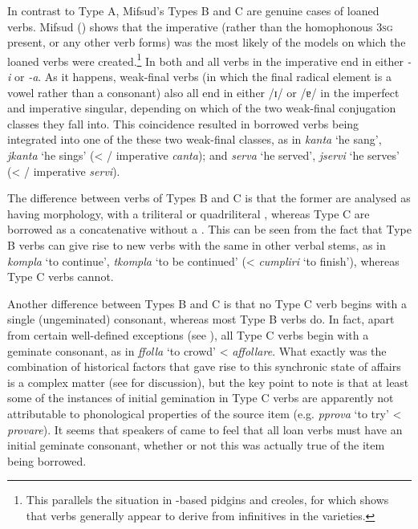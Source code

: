 \documentclass[output=paper]{langsci/langscibook}
\begin{document}
In contrast to Type A, Mifsud's Types B and C are genuine cases of loaned verbs. Mifsud (\citeyear[110--116]{mifsudloanverbs}) shows that the imperative (rather than the homophonous 3\textsc{sg} present, or any other verb forms) was the most likely  of the  models on which the  loaned verbs were created.\footnote{This parallels the situation in -based pidgins and creoles, for which \cite{Versteegh2014pidgin} shows that verbs generally appear to derive from infinitives in the  varieties.} In both  and  all verbs in the imperative end in either \textit{-i} or \textit{-a}. As it happens,  weak-final verbs (in which the final radical element is a vowel rather than a consonant) also all end in either /ɪ/ or /ɐ/ in the imperfect and imperative singular, depending on which of the two weak-final conjugation classes they fall into. This coincidence resulted in borrowed  verbs being integrated into one of the these two weak-final classes, as in \textit{kanta} `he sang', \textit{jkanta} `he sings' (< / imperative \textit{canta}); and \textit{serva} `he served', \textit{jservi} `he serves' (< / imperative \textit{servi}).

The difference between verbs of Types B and C is that the former are analysed as having  morphology, with a triliteral or quadriliteral , whereas Type C are borrowed as a concatenative  without a . This can be seen from the fact that Type B verbs can give rise to new verbs with the same  in other verbal stems, as in \textit{kompla} `to continue', \textit{tkompla} `to be continued' (<  \textit{cumpliri} `to finish'), whereas Type C verbs cannot.

Another difference between Types B and C is that no Type C verb begins with a single (ungeminated) consonant, whereas most Type B verbs do. In fact, apart from certain well-defined exceptions (see \citealt[152]{mifsudloanverbs}), all Type C verbs begin with a geminate consonant, as in \textit{ffolla} `to crowd' <  \textit{affollare}. What exactly was the combination of historical factors that gave rise to this synchronic state of affairs is a complex matter (see \citealt[158--168]{mifsudloanverbs} for discussion), but the key point to note is that at least some of the instances of initial gemination in Type C verbs are apparently not attributable to phonological properties of the source item (e.g. \textit{pprova} `to try' <  \textit{provare}). It seems that speakers of  came to feel that all loan verbs must have an initial geminate consonant, whether or not this was actually true of the item being borrowed.
\end{document}
